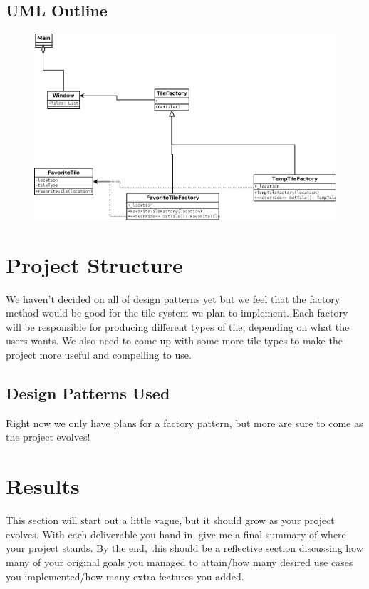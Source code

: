 \documentclass[10pt,conference,onecolumn,compsoc]{IEEEtran}
\begin{document}
\subsection{UML Outline}
\begin{figure}[ht!]
\includegraphics[scale = 0.3]{WeatherApp.png}
\end{figure}

\section{Project Structure}
We haven't decided on all of design patterns yet but we feel that the factory method would be good for the tile system we plan to implement. Each factory will be responsible for producing different types of tile, depending on what the users wants. We also need to come up with some more tile types to make the project more useful and compelling to use.




\subsection{Design Patterns Used}
Right now we only have plans for a factory pattern, but more are sure to come as the project evolves!


\section{Results}
This section will start out a little vague, but it should grow as your project evolves.  With each deliverable you hand in, give me a final summary of where your project stands.  By the end, this should be a reflective section discussing how many of your original goals you managed to attain/how many desired use cases you implemented/how many extra features you added.
\end{document}

